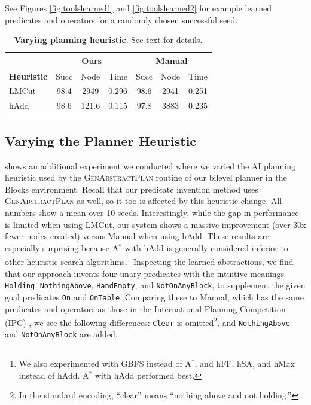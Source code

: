 See Figures \ref{fig:toolslearned1} and \ref{fig:toolslearned2} for example learned predicates and operators for a randomly chosen successful seed.


\begin{table}
\begin{center}
\scriptsize
\begin{tabular}{| l | c | c | c | c | c | c | }
	\hline
	\multicolumn{1}{|c|}{} &\multicolumn{3}{c|}{\bf{Ours}} &
	\multicolumn{3}{c|}{\bf{Manual}} \\
	\hline
	\bf{Heuristic} &
	{Succ} & {Node} & {Time}&
	{Succ} & {Node} & {Time}\\
	\hline
	LMCut & 98.4 & 2949 & 0.296 & 98.6 & 2941 & 0.251 \\
	hAdd & 98.6 & 121.6 & 0.115 & 97.8 & 3883 & 0.235 \\\hline
	\end{tabular}
	\caption{\textbf{Varying planning heuristic}. See text for details.}
	\label{tab:varying-heuristic}
\end{center}
\end{table}






\subsection{Varying the Planner Heuristic}
\label{app:more-blocks-explanations}

 shows an additional experiment we conducted where we varied the AI planning heuristic used by the \textsc{GenAbstractPlan} routine of our bilevel planner in the Blocks environment.
Recall that our predicate invention method uses \textsc{GenAbstractPlan} as well, so it too is affected by this heuristic change. All numbers show a mean over 10 seeds. Interestingly, while the gap in performance is limited when using LMCut, our system shows a massive improvement (over 30x fewer nodes created) versus Manual when using hAdd.
These results are especially surprising because A$^*$ with hAdd is generally considered inferior to other heuristic search algorithms.\footnote{We also experimented with GBFS instead of A$^*$, and hFF, hSA, and hMax instead of hAdd. A$^*$ with hAdd performed best.}
Inspecting the learned abstractions, we find that our approach invents four unary predicates with the intuitive meanings \texttt{Holding}, \texttt{NothingAbove}, \texttt{HandEmpty}, and \texttt{NotOnAnyBlock}, to supplement the given goal predicates \texttt{On} and \texttt{OnTable}.
Comparing these to Manual, which has the same predicates and operators as those in the International Planning Competition (IPC) \cite{ipc2000}, we see the following differences: \texttt{Clear} is omitted\footnote{In the standard encoding, ``clear'' means ``nothing above and not holding.''}, and \texttt{NothingAbove} and \texttt{NotOnAnyBlock} are added.

